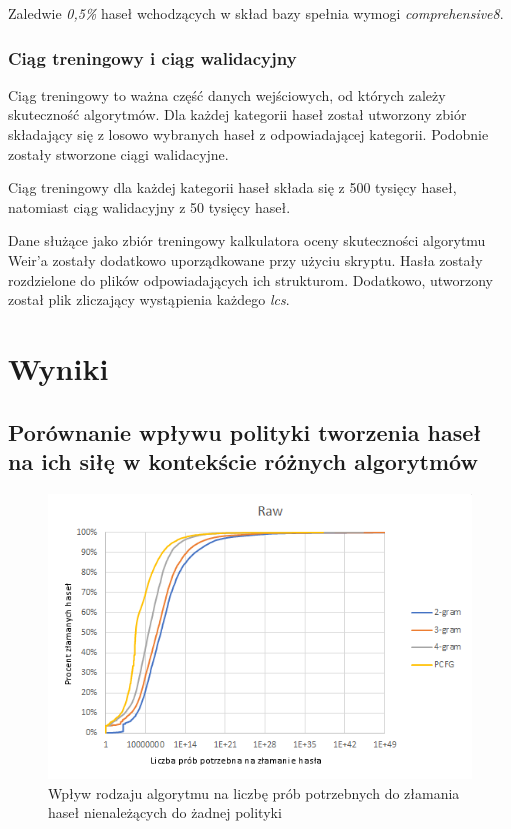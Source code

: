 \documentclass{article}
\begin{document}
	Zaledwie \textit{0,5\%} haseł wchodzących w skład bazy spełnia wymogi \textit{comprehensive8}.
	
	
	\subsubsection{Ciąg treningowy i ciąg walidacyjny}
	Ciąg treningowy to ważna część danych wejściowych, od których zależy skuteczność algorytmów. Dla każdej kategorii haseł został utworzony zbiór składający się z losowo wybranych haseł z odpowiadającej kategorii. Podobnie zostały stworzone ciągi walidacyjne. %

	Ciąg treningowy dla każdej kategorii haseł składa się z 500 tysięcy haseł, natomiast ciąg walidacyjny z 50 tysięcy haseł.

	
	Dane służące jako zbiór treningowy kalkulatora oceny skuteczności algorytmu Weir'a zostały dodatkowo uporządkowane przy użyciu skryptu. Hasła zostały rozdzielone do plików odpowiadających ich strukturom. Dodatkowo, utworzony został plik zliczający wystąpienia każdego \textit{lcs}.
	
	\newpage
	\section{Wyniki}
	\subsection{Porównanie wpływu polityki tworzenia haseł na ich siłę w kontekście różnych algorytmów}
	\begin{figure}[H]
		\centering
		\includegraphics{raw}
		\caption{Wpływ rodzaju algorytmu na liczbę prób potrzebnych do złamania haseł nienależących do żadnej polityki}
	\end{figure}
\end{document}
